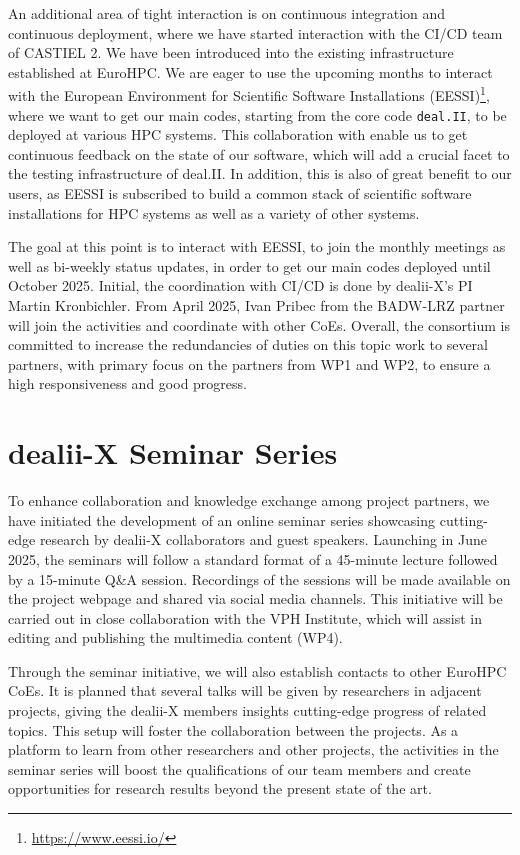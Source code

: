 \documentclass[a4paper,12pt]{article}
\begin{document}
An additional area of tight interaction is on continuous integration and
continuous deployment, where we have started interaction with the CI/CD team
of CASTIEL 2. We have been introduced into the existing infrastructure
established at EuroHPC. We are eager to use the upcoming months to interact
with the European Environment for Scientific Software Installations
(EESSI)\footnote{\url{https://www.eessi.io/}}, where we want to get our main
codes, starting from the core code \texttt{deal.II}, to be deployed at various
HPC systems. This collaboration with enable us to get continuous feedback on
the state of our software, which will add a crucial facet to the testing
infrastructure of deal.II. In addition, this is also of great benefit to our
users, as EESSI is subscribed to build a common stack of scientific software
installations for HPC systems as well as a variety of other systems.

The goal at this point is to interact with EESSI, to join the monthly meetings
as well as bi-weekly status updates, in order to get our main codes deployed
until October 2025. Initial, the coordination with CI/CD is done by dealii-X's
PI Martin Kronbichler. From April 2025, Ivan Pribec from the BADW-LRZ partner
will join the activities and coordinate with other CoEs. Overall, the
consortium is committed to increase the redundancies of duties on this topic
work to several partners, with primary focus on the partners from WP1 and WP2,
to ensure a high responsiveness and good progress.

\section{dealii-X Seminar Series}

To enhance collaboration and knowledge exchange among project partners, we have
initiated the development of an online seminar series showcasing cutting-edge
research by dealii-X collaborators and guest speakers. Launching in June 2025,
the seminars will follow a standard format of a 45-minute lecture followed by a
15-minute Q\&A session. Recordings of the sessions will be made available on the
project webpage and shared via social media channels. This initiative will be
carried out in close collaboration with the VPH Institute, which will assist in
editing and publishing the multimedia content (WP4).

Through the seminar initiative, we will also establish contacts to other
EuroHPC CoEs. It is planned that several talks will be given by researchers in
adjacent projects, giving the dealii-X members insights cutting-edge progress
of related topics. This setup will foster the collaboration between the
projects. As a platform to learn from other researchers and other projects,
the activities in the seminar series will boost the qualifications of our team
members and create opportunities for research results beyond the present state
of the art.
\end{document}
